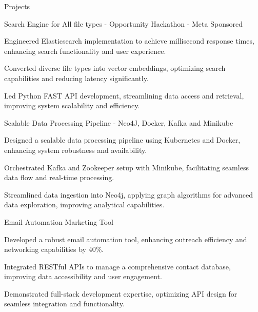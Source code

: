 \documentclass{resume} %
\begin{document}
    \begin{rSection}{Projects}
                    \begin{rSubsection}
                                    {Search Engine for All file types {-} Opportunity Hackathon {-} Meta Sponsored}
                                {\normalfont{ - }}{}{}
                                    \item Engineered Elasticsearch implementation to achieve millisecond response times, enhancing search functionality and user experience.
                                    \item Converted diverse file types into vector embeddings, optimizing search capabilities and reducing latency significantly.
                                    \item Led Python FAST API development, streamlining data access and retrieval, improving system scalability and efficiency.
                            \end{rSubsection}
                    \begin{rSubsection}
                                    {Scalable Data Processing Pipeline {-} Neo4J, Docker, Kafka and Minikube}
                                {\normalfont{ - }}{}{}
                                    \item Designed a scalable data processing pipeline using Kubernetes and Docker, enhancing system robustness and availability.
                                    \item Orchestrated Kafka and Zookeeper setup with Minikube, facilitating seamless data flow and real{-}time processing.
                                    \item Streamlined data ingestion into Neo4j, applying graph algorithms for advanced data exploration, improving analytical capabilities.
                            \end{rSubsection}
                    \begin{rSubsection}
                                    {Email Automation Marketing Tool}
                                {\normalfont{ - }}{}{}
                                    \item Developed a robust email automation tool, enhancing outreach efficiency and networking capabilities by 40\%.
                                    \item Integrated RESTful APIs to manage a comprehensive contact database, improving data accessibility and user engagement.
                                    \item Demonstrated full{-}stack development expertise, optimizing API design for seamless integration and functionality.
                            \end{rSubsection}
            \end{rSection}
\end{document}
